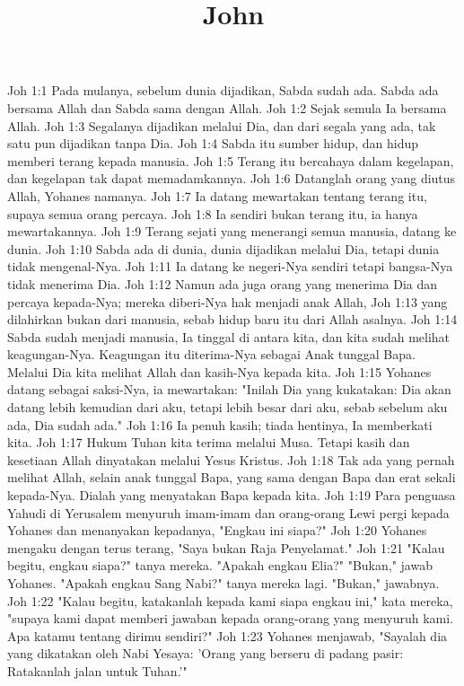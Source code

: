 

\title{John}

Joh 1:1  Pada mulanya, sebelum dunia dijadikan, Sabda sudah ada. Sabda ada bersama Allah dan Sabda sama dengan Allah.
Joh 1:2  Sejak semula Ia bersama Allah.
Joh 1:3  Segalanya dijadikan melalui Dia, dan dari segala yang ada, tak satu pun dijadikan tanpa Dia.
Joh 1:4  Sabda itu sumber hidup, dan hidup memberi terang kepada manusia.
Joh 1:5  Terang itu bercahaya dalam kegelapan, dan kegelapan tak dapat memadamkannya.
Joh 1:6  Datanglah orang yang diutus Allah, Yohanes namanya.
Joh 1:7  Ia datang mewartakan tentang terang itu, supaya semua orang percaya.
Joh 1:8  Ia sendiri bukan terang itu, ia hanya mewartakannya.
Joh 1:9  Terang sejati yang menerangi semua manusia, datang ke dunia.
Joh 1:10  Sabda ada di dunia, dunia dijadikan melalui Dia, tetapi dunia tidak mengenal-Nya.
Joh 1:11  Ia datang ke negeri-Nya sendiri tetapi bangsa-Nya tidak menerima Dia.
Joh 1:12  Namun ada juga orang yang menerima Dia dan percaya kepada-Nya; mereka diberi-Nya hak menjadi anak Allah,
Joh 1:13  yang dilahirkan bukan dari manusia, sebab hidup baru itu dari Allah asalnya.
Joh 1:14  Sabda sudah menjadi manusia, Ia tinggal di antara kita, dan kita sudah melihat keagungan-Nya. Keagungan itu diterima-Nya sebagai Anak tunggal Bapa. Melalui Dia kita melihat Allah dan kasih-Nya kepada kita.
Joh 1:15  Yohanes datang sebagai saksi-Nya, ia mewartakan: "Inilah Dia yang kukatakan: Dia akan datang lebih kemudian dari aku, tetapi lebih besar dari aku, sebab sebelum aku ada, Dia sudah ada."
Joh 1:16  Ia penuh kasih; tiada hentinya, Ia memberkati kita.
Joh 1:17  Hukum Tuhan kita terima melalui Musa. Tetapi kasih dan kesetiaan Allah dinyatakan melalui Yesus Kristus.
Joh 1:18  Tak ada yang pernah melihat Allah, selain anak tunggal Bapa, yang sama dengan Bapa dan erat sekali kepada-Nya. Dialah yang menyatakan Bapa kepada kita.
Joh 1:19  Para penguasa Yahudi di Yerusalem menyuruh imam-imam dan orang-orang Lewi pergi kepada Yohanes dan menanyakan kepadanya, "Engkau ini siapa?"
Joh 1:20  Yohanes mengaku dengan terus terang, "Saya bukan Raja Penyelamat."
Joh 1:21  "Kalau begitu, engkau siapa?" tanya mereka. "Apakah engkau Elia?" "Bukan," jawab Yohanes. "Apakah engkau Sang Nabi?" tanya mereka lagi. "Bukan," jawabnya.
Joh 1:22  "Kalau begitu, katakanlah kepada kami siapa engkau ini," kata mereka, "supaya kami dapat memberi jawaban kepada orang-orang yang menyuruh kami. Apa katamu tentang dirimu sendiri?"
Joh 1:23  Yohanes menjawab, "Sayalah dia yang dikatakan oleh Nabi Yesaya: 'Orang yang berseru di padang pasir: Ratakanlah jalan untuk Tuhan.'"
